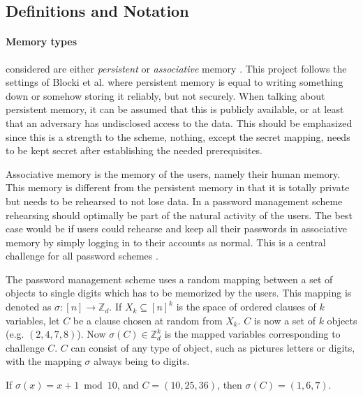\subsection{Definitions and Notation}
\paragraph{Memory types} considered are either \emph{persistent} or \emph{associative} memory \cite{human-memory}. This project follows the settings of Blocki et al. \cite{naturally-rehearsing, hcp-blocki} where persistent memory is equal to writing something down or somehow storing it reliably, but not securely. When talking about persistent memory, it can be assumed that this is publicly available, or at least that an adversary has undisclosed access to the data. This should be emphasized since this is a strength to the scheme, nothing, except the secret mapping, needs to be kept secret after establishing the needed prerequisites. 
    \par Associative memory is the memory of the users, namely their human memory. This memory is different from the persistent memory in that it is totally private but needs to be rehearsed to not lose data. In a password management scheme rehearsing should optimally be part of the natural activity of the users. The best case would be if users could rehearse and keep all their passwords in associative memory by simply logging in to their accounts as normal. This is a central challenge for all password schemes \cite{naturally-rehearsing}.

The password management scheme uses a random mapping between a set of objects to single digits which has to be memorized by the users. This mapping is denoted as $\sigma : [n] \rightarrow \mathbb{Z}_d$. If $X_k \subseteq [n]^k$ is the space of ordered clauses of $k$ variables, let $C$ be a clause chosen at random from $X_k$. $C$ is now a set of $k$ objects (e.g. $(2,4,7,8)$). Now $\sigma (C) \in \mathbb{Z}_d^k$ is the mapped variables corresponding to challenge $C$. $C$ can consist of any type of object, such as pictures letters or digits, with the mapping $\sigma$ always being to digits.

\begin{example}
    If $\sigma(x) = x+1  \bmod 10$, and $C = (10,25,36)$, then $\sigma(C) = (1,6,7)$.
\end{example}

